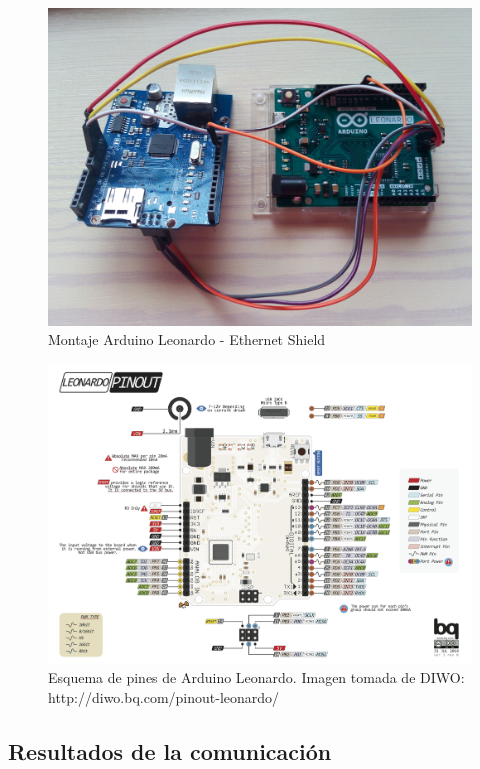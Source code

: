     \begin{figure}[H]
    \centering
    \includegraphics[scale = 0.13]{capitulo_04/figuras_dir/montajethernet.jpg}
    \caption{Montaje Arduino Leonardo - Ethernet Shield}
    \label{fig: montajethet}
    \end{figure}
    
    \begin{figure}
    \centering
    \includegraphics[scale = 0.4]{capitulo_04/figuras_dir/leonardo.jpg}
    \caption{Esquema de pines de Arduino Leonardo. Imagen tomada de DIWO: http://diwo.bq.com/pinout-leonardo/}
    \label{fig: pinout}
    \end{figure}
\subsection{Resultados de la comunicación} \label{s4_4_3}

